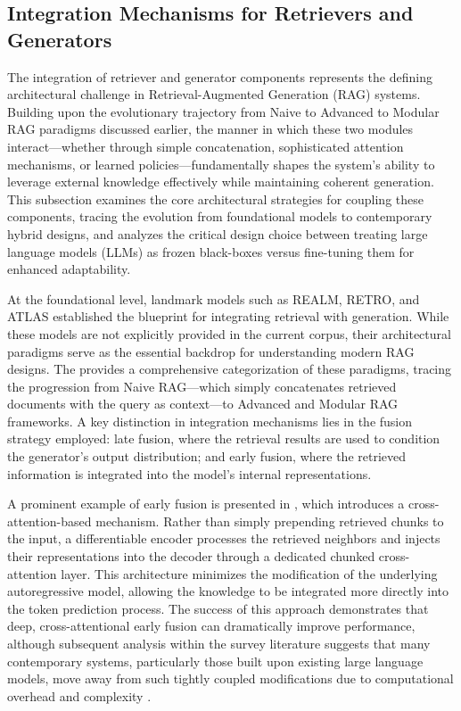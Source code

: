 \documentclass[11pt]{article}
\begin{document}
\subsection{Integration Mechanisms for Retrievers and Generators}

The integration of retriever and generator components represents the defining architectural challenge in Retrieval-Augmented Generation (RAG) systems. Building upon the evolutionary trajectory from Naive to Advanced to Modular RAG paradigms discussed earlier, the manner in which these two modules interact---whether through simple concatenation, sophisticated attention mechanisms, or learned policies---fundamentally shapes the system's ability to leverage external knowledge effectively while maintaining coherent generation. This subsection examines the core architectural strategies for coupling these components, tracing the evolution from foundational models to contemporary hybrid designs, and analyzes the critical design choice between treating large language models (LLMs) as frozen black-boxes versus fine-tuning them for enhanced adaptability.

At the foundational level, landmark models such as REALM, RETRO, and ATLAS established the blueprint for integrating retrieval with generation. While these models are not explicitly provided in the current corpus, their architectural paradigms serve as the essential backdrop for understanding modern RAG designs. The \cite{ref23} provides a comprehensive categorization of these paradigms, tracing the progression from Naive RAG---which simply concatenates retrieved documents with the query as context---to Advanced and Modular RAG frameworks. A key distinction in integration mechanisms lies in the fusion strategy employed: late fusion, where the retrieval results are used to condition the generator's output distribution; and early fusion, where the retrieved information is integrated into the model's internal representations.

A prominent example of early fusion is presented in \cite{ref54}, which introduces a cross-attention-based mechanism. Rather than simply prepending retrieved chunks to the input, a differentiable encoder processes the retrieved neighbors and injects their representations into the decoder through a dedicated chunked cross-attention layer. This architecture minimizes the modification of the underlying autoregressive model, allowing the knowledge to be integrated more directly into the token prediction process. The success of this approach demonstrates that deep, cross-attentional early fusion can dramatically improve performance, although subsequent analysis within the survey literature suggests that many contemporary systems, particularly those built upon existing large language models, move away from such tightly coupled modifications due to computational overhead and complexity \cite{ref23}.
\end{document}
